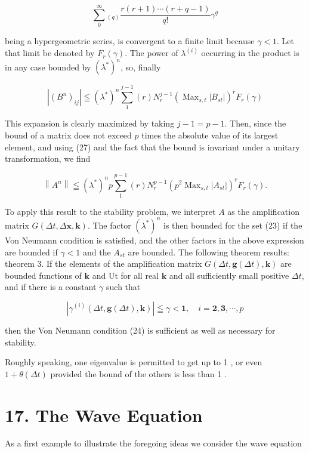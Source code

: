 \documentclass[10pt]{article}
\begin{document}
\[
\sum_{0}^{\infty}{ }_{(q)} \frac{r(r+1) \cdots(r+q-1)}{q!} \gamma^{q}
\]

being a hypergeometric series, is convergent to a finite limit because \(\gamma<1\). Let that limit be denoted by \(F_{r}(\gamma)\). The power of \(\lambda^{(i)}\) occurring in the product is in any case bounded by \(\left(\lambda^{*}\right)^{n}\), so, finally

\[
\left|\left(B^{n}\right)_{i j}\right| \leqq\left(\lambda^{*}\right)^{n} \sum_{1}^{j-1}(r) N_{r}^{j-1}\left(\operatorname{Max}_{s, t}\left|B_{s t}\right|\right)^{r} F_{r}(\gamma)
\]

This expansion is clearly maximized by taking \(j-1=p-1\). Then, since the bound of a matrix does not exceed \(p\) times the absolute value of its largest element, and using (27) and the fact that the bound is invariant under a unitary transformation, we find

\[
\left\|A^{n}\right\| \leqq\left(\lambda^{*}\right)^{n} p \sum_{1}^{p-1}(r) N_{r}^{p-1}\left(p^{2} \operatorname{Max}_{s, t}\left|A_{s t}\right|\right)^{r} F_{r}(\gamma) .
\]

To apply this result to the stability problem, we interpret \(A\) as the amplification matrix \(G(\Delta t, \Delta \mathbf{x}, \mathbf{k})\). The factor \(\left(\lambda^{*}\right)^{n}\) is then bounded for the set (23) if the Von Neumann condition is satisfied, and the other factors in the above expression are bounded if \(\gamma<1\) and the \(A_{s t}\) are bounded. The following theorem results:\\
theorem 3. If the elements of the amplification matrix \(G(\Delta t, \mathbf{g}(\Delta t), \mathbf{k})\) are bounded functions of \(\mathbf{k}\) and Ut for all real \(\mathbf{k}\) and all sufficiently small positive \(\Delta t\), and if there is a constant \(\gamma\) such that

\[
\left|\gamma^{(i)}(\Delta t, \mathbf{g}(\Delta t), \mathbf{k})\right| \leqq \gamma<\mathbf{1}, \quad i=\mathbf{2}, \mathbf{3}, \cdots, p
\]

then the Von Neumann condition (24) is sufficient as well as necessary for stability.

Roughly speaking, one eigenvalue is permitted to get up to 1 , or even \(1+\theta(\Delta t)\) provided the bound of the others is less than 1 .

\section*{17. The Wave Equation}
As a first example to illustrate the foregoing ideas we consider the wave equation
\end{document}
